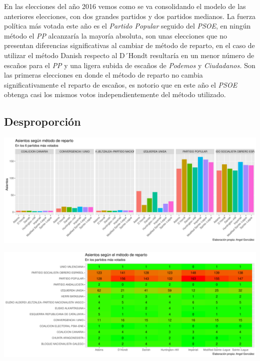 \documentclass[12pt,a4paper,]{book}
\numberwithin{dummy}{section}
\theoremstyle{ocrenumbox}
\theoremstyle{blacknumex}
\theoremstyle{blacknumbox}
\theoremstyle{ocrenum}
\theoremstyle{ocrenum}
\begin{document}
En las elecciones del año 2016 vemos como se va consolidando el modelo
de las anteriores elecciones, con dos grandes partidos y dos partidos
medianos. La fuerza política más votada este año es el \emph{Partido
Popular} seguido del \emph{PSOE}, en ningún método el \emph{PP}
alcanzaría la mayoría absoluta, son unas elecciones que no presentan
diferencias significativas al cambiar de método de reparto, en el caso
de utilizar el método Danish respecto al D´Hondt resultaría en un menor
número de escaños para el \emph{PP} y una ligera subida de escaños de
\emph{Podemos} y \emph{Ciudadanos.} Son las primeras elecciones en donde
el método de reparto no cambia significativamente el reparto de escaños,
es notorio que en este año el \emph{PSOE} obtenga casi los mismos votos
independientemente del método utilizado.

\hypertarget{desproporciuxf3n-12}{%
\subsection{Desproporción}\label{desproporciuxf3n-12}}

\begin{center}\includegraphics[width=1\linewidth]{figurasR/unnamed-chunk-113-1} \end{center}

\begin{center}\includegraphics[width=1\linewidth]{figurasR/unnamed-chunk-113-2} \end{center}
\end{document}

